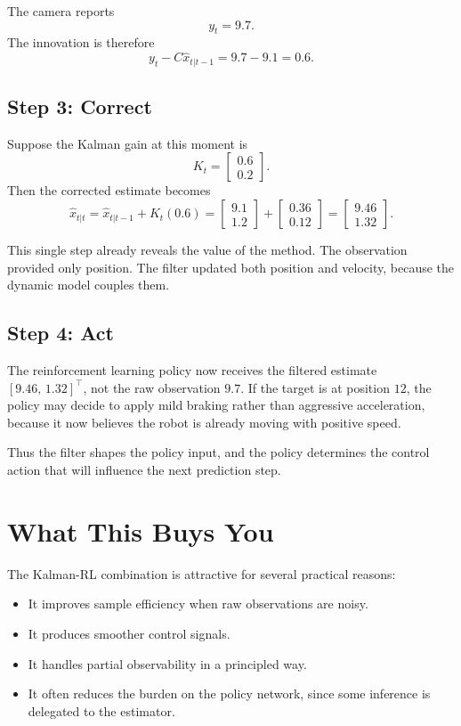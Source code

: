 \documentclass[12pt,a4paper]{article}
\begin{document}
The camera reports
\[
y_t = 9.7.
\]
The innovation is therefore
\[
y_t - C\hat{x}_{t|t-1} = 9.7 - 9.1 = 0.6.
\]

\subsection{Step 3: Correct}

Suppose the Kalman gain at this moment is
\[
K_t =
\begin{bmatrix}
0.6\\
0.2
\end{bmatrix}.
\]
Then the corrected estimate becomes
\[
\hat{x}_{t|t}
=
\hat{x}_{t|t-1} + K_t(0.6)
=
\begin{bmatrix}
9.1\\
1.2
\end{bmatrix}
+
\begin{bmatrix}
0.36\\
0.12
\end{bmatrix}
=
\begin{bmatrix}
9.46\\
1.32
\end{bmatrix}.
\]

This single step already reveals the value of the method. The observation provided only position. The filter updated both position and velocity, because the dynamic model couples them.

\subsection{Step 4: Act}

The reinforcement learning policy now receives the filtered estimate \([9.46,\,1.32]^\top\), not the raw observation \(9.7\). If the target is at position \(12\), the policy may decide to apply mild braking rather than aggressive acceleration, because it now believes the robot is already moving with positive speed.

Thus the filter shapes the policy input, and the policy determines the control action that will influence the next prediction step.

\section{What This Buys You}

The Kalman-RL combination is attractive for several practical reasons:
\begin{itemize}
  \item It improves sample efficiency when raw observations are noisy.
  \item It produces smoother control signals.
  \item It handles partial observability in a principled way.
  \item It often reduces the burden on the policy network, since some inference is delegated to the estimator.
\end{itemize}
\end{document}
